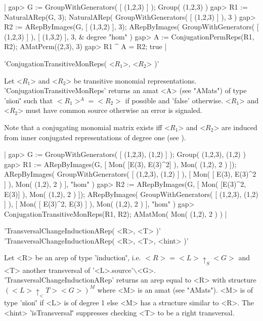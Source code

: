 |    gap> G := GroupWithGenerators( [ (1,2,3) ] );
    Group( (1,2,3) )
    gap> R1 := NaturalARep(G, 3);
    NaturalARep( GroupWithGenerators( [ (1,2,3) ] ), 3 )
    gap> R2 := ARepByImages(G, [ (1,3,2) ], 3);
    ARepByImages(
      GroupWithGenerators( [ (1,2,3) ] ),
      [ (1,3,2)
      ],
      3, & degree
      "hom"
    )
    gap> A := ConjugationPermReps(R1, R2);
    AMatPerm((2,3), 3) 
    gap> R1 ^ A = R2;
    true |


'ConjugationTransitiveMonReps( <$R_1$>, <$R_2$> )'

Let <$R_1$> and <$R_2$> be transitive monomial representations.
'ConjugationTransitiveMonReps' returns an amat <A>
(see "AMats") of type '\"mon\"' such that $<R_1>^A = <R_2>$ 
if possible and 'false' otherwise.
<$R_1$> and <$R_2$> must have common source 
otherwise an error is signaled.

Note that a conjugating monomial matrix exists iff <$R_1$> and <$R_2$> 
are induced from inner conjugated representations of degree one
(see \cite{Pue99}).

|    gap> G := GroupWithGenerators( [ (1,2,3), (1,2) ] );
    Group( (1,2,3), (1,2) )
    gap> R1 := ARepByImages(G, [ Mon( [E(3), E(3)^2] ), Mon( (1,2), 2 ) ]);
    ARepByImages(
      GroupWithGenerators( [ (1,2,3), (1,2) ] ),
      [ Mon( [ E(3), E(3)^2 ] ),
        Mon( (1,2), 2 )
      ],
      "hom"
    )
    gap> R2 := ARepByImages(G, [ Mon( [E(3)^2, E(3)] ), Mon( (1,2), 2 ) ]);  
    ARepByImages(
      GroupWithGenerators( [ (1,2,3), (1,2) ] ),
      [ Mon( [ E(3)^2, E(3) ] ),
        Mon( (1,2), 2 )
      ],
      "hom"
    )
    gap> ConjugationTransitiveMonReps(R1, R2);
    AMatMon( Mon( (1,2), 2 ) ) |


'TransversalChangeInductionARep( <R>, <T> )'\\
'TransversalChangeInductionARep( <R>, <T>, <hint> )'

Let <R> be an arep of type '\"induction\"', i.e. 
$<R> = <L>\uparrow_S <G>$ and <T> another transversal of 
'<L>.source'$\backslash$<G>. 
'TransversalChangeInductionARep' returns an arep equal to <R>
with structure $(<L>\uparrow_<T> <G>)^M$
where <M> is an amat (see "AMats"). <M> is of type '\"mon\"'
if <L> is of degree 1 else <M> has a structure similar to <R>.
The <hint> '\"isTransversal\"' suppresses checking <T> to be a 
right transversal.

